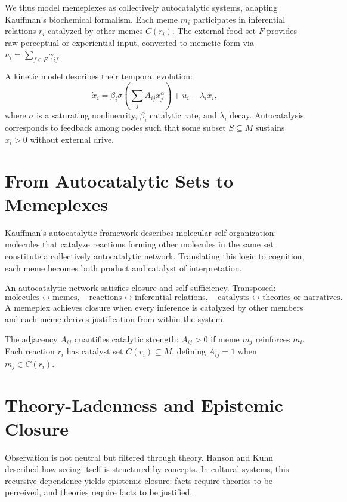 \documentclass[11pt,a4paper]{article}
\newenvironment{narrative}{\begin{itshape}}{\end{itshape}}
\begin{document}
We thus model memeplexes as collectively autocatalytic systems, adapting Kauffman’s biochemical formalism. Each meme \(m_i\) participates in inferential relations \(r_i\) catalyzed by other memes \(C(r_i)\). The external food set \(F\) provides raw perceptual or experiential input, converted to memetic form via \(u_i = \sum_{f\in F} \gamma_{if}\). 

A kinetic model describes their temporal evolution:
\[
\dot{x}_i = \beta_i \sigma\!\left(\sum_j A_{ij} x_j^\alpha\right) + u_i - \lambda_i x_i,
\]
where \(\sigma\) is a saturating nonlinearity, \(\beta_i\) catalytic rate, and \(\lambda_i\) decay.  Autocatalysis corresponds to feedback among nodes such that some subset \(S\subseteq M\) sustains \(x_i>0\) without external drive.

\section{From Autocatalytic Sets to Memeplexes}
\begin{narrative}
Kauffman’s autocatalytic framework describes molecular self-organization: molecules that catalyze reactions forming other molecules in the same set constitute a collectively autocatalytic network. Translating this logic to cognition, each meme becomes both product and catalyst of interpretation.
\end{narrative}

An autocatalytic network satisfies closure and self-sufficiency.  Transposed:
\[
\text{molecules} \leftrightarrow \text{memes},\quad
\text{reactions} \leftrightarrow \text{inferential relations},\quad
\text{catalysts} \leftrightarrow \text{theories or narratives}.
\]
A memeplex achieves closure when every inference is catalyzed by other members and each meme derives justification from within the system.  

The adjacency \(A_{ij}\) quantifies catalytic strength: \(A_{ij}>0\) if meme \(m_j\) reinforces \(m_i\). Each reaction \(r_i\) has catalyst set \(C(r_i)\subseteq M\), defining \(A_{ij}=1\) when \(m_j\in C(r_i)\).

\section{Theory-Ladenness and Epistemic Closure}
\begin{narrative}
Observation is not neutral but filtered through theory. Hanson and Kuhn described how seeing itself is structured by concepts. In cultural systems, this recursive dependence yields epistemic closure: facts require theories to be perceived, and theories require facts to be justified.
\end{narrative}
\end{document}
